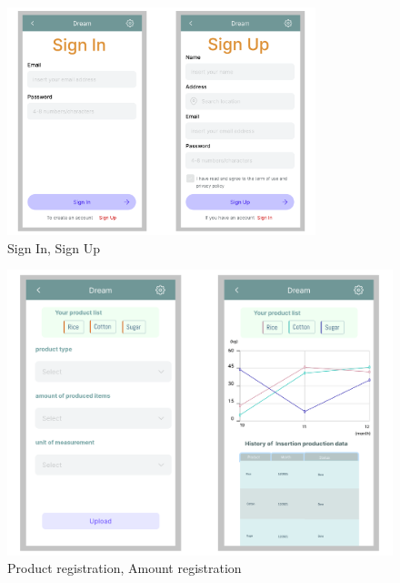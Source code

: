 \newpage
\begin{figure}[H]
	\centering
    \includegraphics[page=1, width=0.8\textwidth]{Images/UI/sign_up_in.pdf}

	\caption{\label{fig:FE_image1}Sign In, Sign Up}

\end{figure}

\begin{figure}[H]
	\centering
    \includegraphics[page=1, width=\textwidth]{Images/UI/product_amount_registration.pdf}
	\caption{\label{fig:FE_image2}Product registration, Amount registration}

\end{figure}




